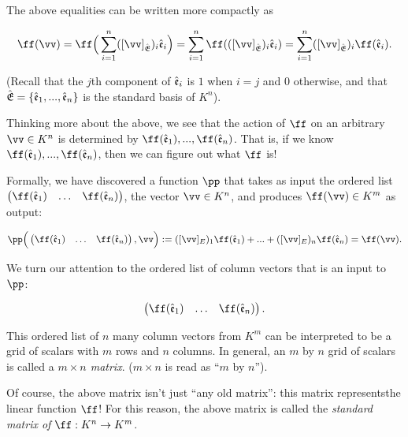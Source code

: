 \begin{deriv}
    The above equalities can be written more compactly as
    
    \begin{align*}
        \ff(\vv) = \ff\Big( \sum_{i = 1}^n ([\vv]_\sE)_i \see_i \Big) = \sum_{i = 1}^n \ff(([\vv]_\sE)_i \see_i) = \sum_{i = 1}^n ([\vv]_\sE)_i \ff(\see_i).
    \end{align*}
    
    (Recall that the $j$th component of $\hat{\mathfrak{e}}_i$ is $1$ when $i = j$ and $0$ otherwise, and that ${\hat{\mathfrak{E}}} = \{\hat{\mathfrak{e}}_1, ..., \hat{\mathfrak{e}}_n\}$ is the standard basis of $K^n$).
    
    Thinking more about the above, we see that the action of $\ff$ on an arbitrary $\vv \in K^n$ is determined by $\ff(\see_1), ..., \ff(\see_n)$. That is, if we know $\ff(\see_1), ..., \ff(\see_n)$, then we can figure out what $\ff$ is!
    
    Formally, we have discovered a function $\pp$ that takes as input the ordered list $\begin{pmatrix} \ff(\see_1) & \hdots & \ff(\see_n) \end{pmatrix}$, the vector $\vv \in K^n$, and produces $\ff(\vv) \in K^m$ as output:
    
    \begin{align*}
        \pp\Big( \begin{pmatrix} \ff(\see_1) & \hdots & \ff(\see_n) \end{pmatrix}, \vv \Big) := ([\vv]_E)_1 \ff(\see_1) + ... + ([\vv]_E)_n \ff(\see_n) = \ff(\vv).
    \end{align*}
    
    We turn our attention to the ordered list of column vectors that is an input to $\pp$:
    
    \begin{align*}
        \begin{pmatrix} 
            \ff(\see_1) & \hdots & \ff(\see_n)
        \end{pmatrix}.
    \end{align*}
    
    This ordered list of $n$ many column vectors from $K^m$ can be interpreted to be a grid of scalars with $m$ rows and $n$ columns. In general, an $m$ by $n$ grid of scalars is called a \textit{$m \times n$ matrix}. ($m \times n$ is read as ``$m$ by $n$'').
    
    Of course, the above matrix isn't just ``any old matrix'': this matrix represents\footnotemark the linear function $\ff$! For this reason, the above matrix is called the \textit{standard matrix of $\ff:K^n \rightarrow K^m$}.
    
\end{deriv}

